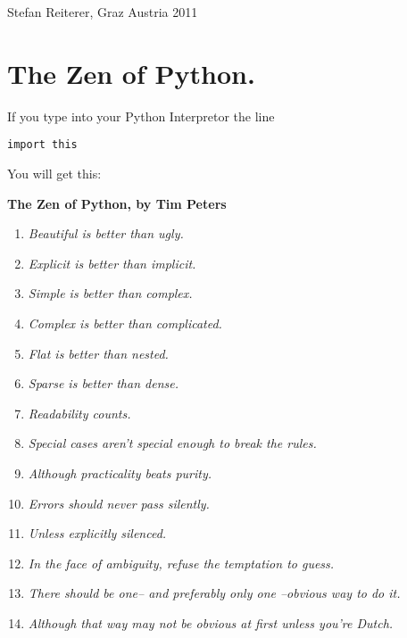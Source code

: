 \documentclass[letterpaper,10pt,english]{manual}
\begin{document}
Stefan Reiterer,
Graz Austria
2011


\section{The Zen of Python.}

If you type into your Python Interpretor the line

\begin{Verbatim}[commandchars=\\\{\}]
import this
\end{Verbatim}

You will get this:

\textbf{The Zen of Python, by Tim Peters}
\begin{enumerate}
\item {} 
\emph{Beautiful is better than ugly.}

\item {} 
\emph{Explicit is better than implicit.}

\item {} 
\emph{Simple is better than complex.}

\item {} 
\emph{Complex is better than complicated.}

\item {} 
\emph{Flat is better than nested.}

\item {} 
\emph{Sparse is better than dense.}

\item {} 
\emph{Readability counts.}

\item {} 
\emph{Special cases aren't special enough to break the rules.}

\item {} 
\emph{Although practicality beats purity.}

\item {} 
\emph{Errors should never pass silently.}

\item {} 
\emph{Unless explicitly silenced.}

\item {} 
\emph{In the face of ambiguity, refuse the temptation to guess.}

\item {} 
\emph{There should be one-- and preferably only one --obvious way to do it.}

\item {} 
\emph{Although that way may not be obvious at first unless you're Dutch.}


\end{enumerate}
\end{document}

